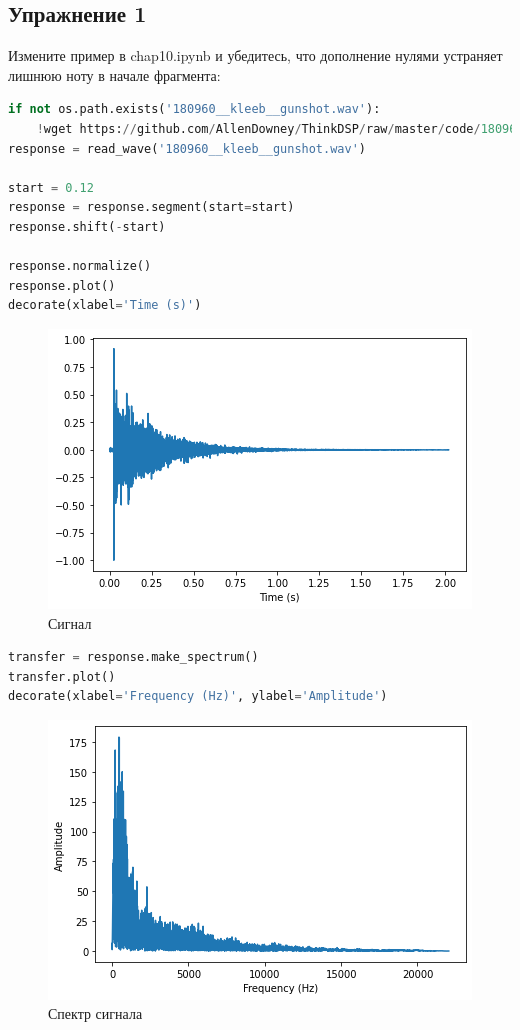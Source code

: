 \subsection{Упражнение 1}

Измените пример в chap10.ipynb и убедитесь, что дополнение нулями устраняет лишнюю ноту в начале фрагмента:

\begin{lstlisting}[language=Python]
if not os.path.exists('180960__kleeb__gunshot.wav'):
    !wget https://github.com/AllenDowney/ThinkDSP/raw/master/code/180960__kleeb__gunshot.wav
response = read_wave('180960__kleeb__gunshot.wav')

start = 0.12
response = response.segment(start=start)
response.shift(-start)

response.normalize()
response.plot()
decorate(xlabel='Time (s)')
\end{lstlisting}
\begin{figure}[H]
	\begin{center}
		\includegraphics[scale=1]{fig/lab10/lab10_5_0.png}
		\caption{Сигнал}
	\end{center}
\end{figure}

\begin{lstlisting}[language=Python]
transfer = response.make_spectrum()
transfer.plot()
decorate(xlabel='Frequency (Hz)', ylabel='Amplitude')
\end{lstlisting}
\begin{figure}[H]
	\begin{center}
		\includegraphics[scale=1]{fig/lab10/lab10_7_0.png}
		\caption{Спектр сигнала}
	\end{center}
\end{figure}

